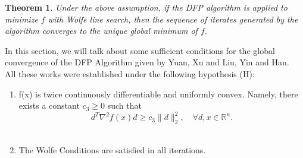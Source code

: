 \documentclass[12pt,a4paper,draft]{article}  %
\newcounter{cite}
\newtheorem{theorem}{Theorem}[section]
\theoremstyle{definition}
\numberwithin{equation}{section}
\begin{document}
\begin{theorem}
    Under the above assumption, if the DFP algorithm is applied to minimize $f$ with Wolfe line search, then the sequence of iterates generated by the algorithm converges to the unique global minimum of $f$.
\end{theorem}
In this section, we will talk about some sufficient conditions for the global convergence of the DFP Algorithm given by Yuan\cite{Yuan}, Xu and Liu\cite{XL}, Yin and Han\cite{YH}.\\
All these works were established under the following hypothesis (H):
    \begin{enumerate}
        \item f(x) is twice continuously differentiable and uniformly convex. Namely, there exists a constant $c_{3} \geq 0$ such that
    \begin{equation*}
        d^{T} \nabla^{2} f(x) d \geqslant c_{3}\|d\|_{2}^{2}, \quad \forall d, x \in \mathbb{R}^{n} . \tag{1.23}
    \end{equation*}\\
    \item The Wolfe Conditions are satisfied in all iterations.
    \end{enumerate}
\end{document}
